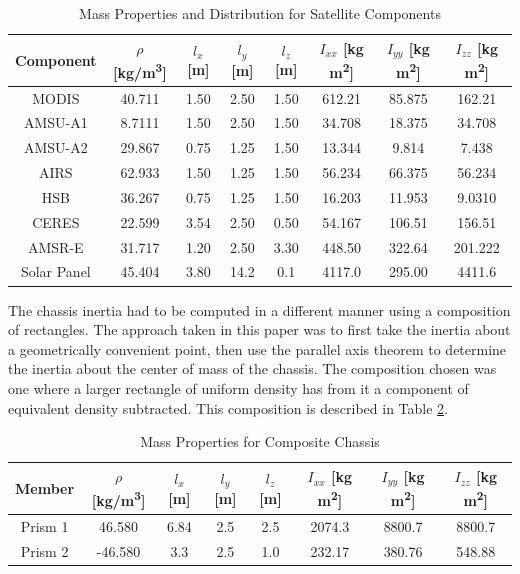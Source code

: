 \begin{table}[H]
    \centering
    \begin{tabular}{c|ccccccc}
    Component & $\rho$ [kg/m\textsuperscript{3}] & $l_x$ [m] & $l_y$ [m] & $l_z$ [m] & $I_{xx}$ [kg m\textsuperscript{2}] & $I_{yy}$ [kg m\textsuperscript{2}] & $I_{zz}$ [kg m\textsuperscript{2}] \\ \hline
    MODIS       &    40.711    &   1.50    &   2.50     &  1.50     &  612.21      &  85.875      &   162.21     \\
    AMSU-A1     &    8.7111    &   1.50    &   2.50     &  1.50     &  34.708     &   18.375     &    34.708    \\
    AMSU-A2     &    29.867    &   0.75    &   1.25     &  1.50     &  13.344     &   9.814     &   7.438     \\
    AIRS        &    62.933    &   1.50    &   1.25     &  1.50     &  56.234     &   66.375     &  56.234      \\
    HSB         &    36.267    &   0.75    &   1.25     &  1.50     &  16.203     &   11.953     &  9.0310      \\
    CERES       &    22.599    &   3.54    &   2.50     &  0.50     &  54.167     &   106.51     &  156.51      \\
    AMSR-E      &    31.717    &   1.20    &   2.50     &  3.30     &  448.50     &   322.64     &  201.222      \\
    Solar Panel &    45.404    &   3.80    &   14.2    &   0.1    &    4117.0    &    295.00    &   4411.6     \\
    \end{tabular}
    \caption{Mass Properties and Distribution for Satellite Components}
    \label{tab:mass_props}
\end{table}

The chassis inertia had to be computed in a different manner using a composition of rectangles. The approach taken in this paper was to first take the inertia about a geometrically convenient point, then use the parallel axis theorem to determine the inertia about the center of mass of the chassis. The composition chosen was one where a larger rectangle of uniform density has from it a component of equivalent density subtracted. This composition is described in Table \ref{tab:composite_chassis}.

\begin{table}[H]
    \centering
    \begin{tabular}{c|ccccccc}
    Member  & $\rho$ [kg/m\textsuperscript{3}] & $l_x$ [m] & $l_y$ [m] & $l_z$ [m] & $I_{xx}$ [kg m\textsuperscript{2}] & $I_{yy}$ [kg m\textsuperscript{2}] & $I_{zz}$ [kg m\textsuperscript{2}] \\ \hline
    Prism 1 &   46.580     &   6.84    &   2.5    &   2.5    &  2074.3      &   8800.7     &   8800.7     \\
    Prism 2 &   -46.580     &  3.3     &   2.5    &   1.0    &  232.17      &   380.76     &   548.88     \\  
    \end{tabular}
    \caption{Mass Properties for Composite Chassis}
    \label{tab:composite_chassis}
\end{table}

